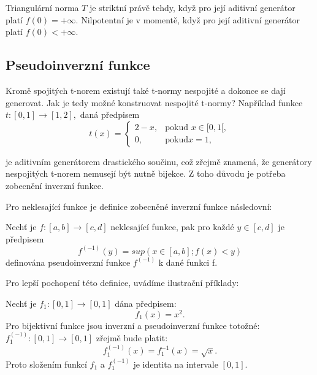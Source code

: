 \begin{remark}
    Triangul\'arn\'i norma $T$ je striktní právě tehdy, když pro její aditivní generátor platí $f(0) = +\infty$. Nilpotentní je v momentě, když pro  její aditivní generátor platí $f(0) < +\infty$.
\end{remark}
\subsection{Pseudoinverzn\'i funkce}

Krom\v e   spojit\'ych t-norem existuj\'i tak\'e t-normy nespojit\'e a dokonce se daj\'i generovat. Jak je tedy možné konstruovat nespojité t-normy? Například funkce $t: [0,1] \rightarrow [1,2],$ daná předpisem $$t(x)= \begin{cases} 2-x, & \mbox {pokud }x \in [0,1[,
    \\ 0, & \mbox {pokud} x = 1,
    \end{cases}$$
    
    je aditivním generátorem drastického součinu, což zřejmě znamená, že generátory nespojitých t-norem nemusejí být nutně bijekce. Z toho d\r uvodu je potřeba zobecnění inverzní funkce.

      Pro neklesající  funkce je definice zobecn\v en\'e inverzn\'i funkce n\'asledovn\'i:
\begin{definition}
    \cite{hlinena}
    Nech\v t je $f:[a,b] \rightarrow [c,d]$ neklesající funkce, pak pro každé $y \in [c,d]$ je předpisem $$f^{(-1)}(y) = sup(x \in [a,b];f(x)<y)$$
    definována pseudoinverzní funkce $f^{(-1)}$ k dané funkci f.
\end{definition}

Pro lep\v s\'i pochopen\'i t\'eto definice, uv\'ad\'ime ilustra\v cn\'i p\v r\'iklady:

\begin{example} 
    Nech\v t je  $f_1:[0,1] \rightarrow [0,1]$  dána předpisem:
    $$f_1(x)=x^2.$$
   Pro bijektivn\'i funkce jsou inverzn\'i a pseudoinverzn\'i funkce toto\v zn\'e: \newline$f_1^{(-1)}:[0,1] \rightarrow [0,1]$ zřejmě bude platit:
    $$f_1^{(-1)}(x)=f_1^{-1}(x)= \sqrt{x}.$$
    Proto složením funkcí $f_1$ a $f_1^{(-1)}$ je
    identita na intervale $[0,1].$
\end{example} 



